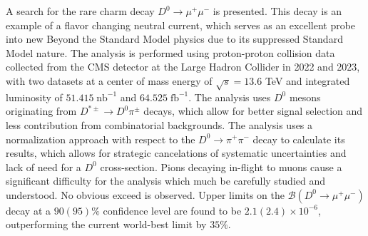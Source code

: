 %
%

A search for the rare charm decay $D^0 \to \mu^+ \mu^-$ is presented. This decay is an example of a flavor changing neutral current, which serves as an excellent probe into new Beyond the Standard Model physics due to its suppressed Standard Model nature. The analysis is performed using proton-proton collision data collected from the CMS detector at the Large Hadron Collider in 2022 and 2023, with two datasets at a center of mass energy of $\sqrt{s} = 13.6$ TeV and integrated luminosity of $51.415\; \text{nb}^{-1}$ and $64.525\; \text{fb}^{-1}$. The analysis uses $D^0$ mesons originating from $D^{*\pm} \to D^0 \pi^\pm$ decays, which allow for better signal selection and less contribution from combinatorial backgrounds. The analysis uses a normalization approach with respect to the $D^0 \to \pi^+ \pi^-$ decay to calculate its results, which allows for strategic cancelations of systematic uncertainties and lack of need for a $D^0$ cross-section. Pions decaying in-flight to muons cause a significant difficulty for the analysis which much be carefully studied and understood. No obvious exceed is observed. Upper limits on the $\mathcal{B}(D^0 \to \mu^+ \mu^-)$ decay at a $90(95)\%$ confidence level are found to be $2.1(2.4)\times10^{-6}$, outperforming the current world-best limit by $35\%$. 